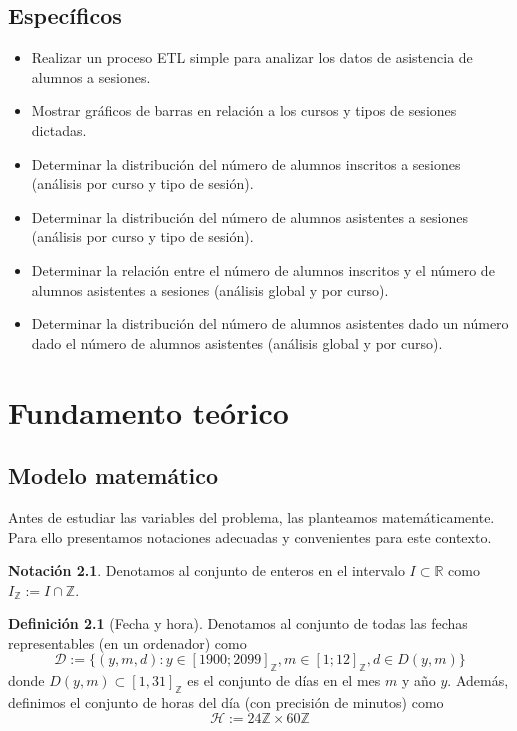 \documentclass[11pt,a4paper]{book}
\theoremstyle{definition}%
\newtheorem{definicion}[teorema]{Definici\'on}
\newtheorem{notacion}[teorema]{Notaci\'on}
\newcommand{\Real}{\mathbb{R}}
\newcommand{\Integer}{\mathbb{Z}}
\begin{document}
            \section{Específicos}
                \begin{itemize}
                    \item Realizar un proceso ETL simple para analizar los datos de asistencia de alumnos a sesiones.
                    \item Mostrar gráficos de barras en relación a los cursos y tipos de sesiones dictadas.
                    \item Determinar la distribución del número de alumnos inscritos a sesiones (análisis por curso y tipo de sesión).
                    \item Determinar la distribución del número de alumnos asistentes a sesiones (análisis por curso y tipo de sesión).
                    \item Determinar la relación entre el número de alumnos inscritos y el número de alumnos asistentes a sesiones (análisis global y por curso).
                    \item Determinar la distribución del número de alumnos asistentes dado un número dado el número de alumnos asistentes (análisis global y por curso).
                \end{itemize}
        \chapter{Fundamento teórico}
            \section{Modelo matemático}
            Antes de estudiar las variables del problema, las planteamos matemáticamente. Para ello presentamos notaciones adecuadas y convenientes para este contexto.

            \begin{notacion}
                Denotamos al conjunto de enteros en el intervalo $I\subset\Real$ como $I_\mathbb{Z}:=I\cap\mathbb{Z}$.
            \end{notacion}
            
            \begin{definicion}[Fecha y hora]
                Denotamos al conjunto de todas las fechas representables (en un ordenador) como
                \begin{equation*}
                    \mathcal{D}:=\{(y,m,d):y\in [1900;2099]_\Integer, m\in[1;12]_\Integer, d\in D(y,m)\}
                \end{equation*}
                donde $D(y,m)\subset[1,31]_\Integer$ es el conjunto de días en el mes $m$ y año $y$. Además, definimos el conjunto de horas del día (con precisión de minutos) como
                \begin{equation*}
                    \mathcal{H}:=24\Integer\times 60\Integer
                \end{equation*}
            \end{definicion}
            
\end{document}
